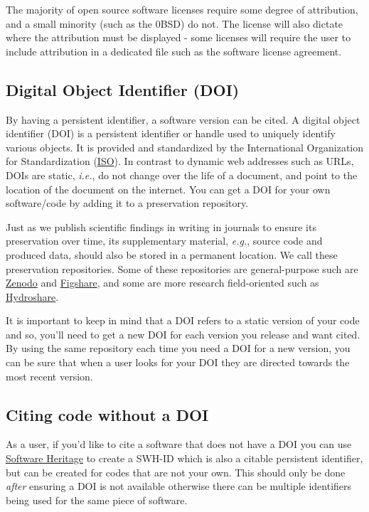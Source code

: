 \documentclass[
  letterpaper,
  DIV=11,
  numbers=noendperiod]{scrreport}
\begin{document}
The majority of open source software licenses require some degree of
attribution, and a small minority (such as the 0BSD) do not. The license
will also dictate where the attribution must be displayed - some
licenses will require the user to include attribution in a dedicated
file such as the software license agreement.

\hypertarget{digital-object-identifier-doi}{%
\subsection{Digital Object Identifier
(DOI)}\label{digital-object-identifier-doi}}

By having a persistent identifier, a software version can be cited. A
digital object identifier (DOI) is a persistent identifier or handle
used to uniquely identify various objects. It is provided and
standardized by the International Organization for Standardization
(\href{https://www.iso.org/home.html}{ISO}). In contrast to dynamic web
addresses such as URLs, DOIs are static, \emph{i.e.}, do not change over
the life of a document, and point to the location of the document on the
internet. You can get a DOI for your own software/code by adding it to a
preservation repository.

Just as we publish scientific findings in writing in journals to ensure
its preservation over time, its supplementary material, \emph{e.g.},
source code and produced data, should also be stored in a permanent
location. We call these preservation repositories. Some of these
repositories are general-purpose such are
\href{https://zenodo.org/}{Zenodo} and
\href{https://figshare.com/}{Figshare}, and some are more research
field-oriented such as \href{https://www.hydroshare.org/}{Hydroshare}.

It is important to keep in mind that a DOI refers to a static version of
your code and so, you'll need to get a new DOI for each version you
release and want cited. By using the same repository each time you need
a DOI for a new version, you can be sure that when a user looks for your
DOI they are directed towards the most recent version.

\hypertarget{citing-code-without-a-doi}{%
\subsection{Citing code without a DOI}\label{citing-code-without-a-doi}}

As a user, if you'd like to cite a software that does not have a DOI you
can use \href{https://www.softwareheritage.org/}{Software Heritage} to
create a SWH-ID which is also a citable persistent identifier, but can
be created for codes that are not your own. This should only be done
\emph{after} ensuring a DOI is not available otherwise there can be
multiple identifiers being used for the same piece of software.
\end{document}

